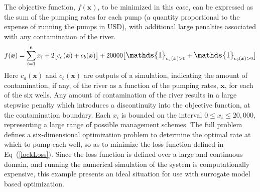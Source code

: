 \documentclass[12pt]{article}
\def \oner {
        \mathlarger{\mathds{1}}
}
\begin{document}
%
%

%
The objective function, $f(\bm{x})$, to be minimized in this case, can be expressed as the sum of the pumping rates for each pump (a quantity proportional to the expense of running the pumps in USD), with additional large penalties associated with any contamination of the river. %
\begin{equation}
f(\bm{x}) = \sum_{i=1}^6 x_i +  2\big[ c_a(\bm{x}) + c_b(\bm{x}) \big] + 20000 \big[ \oner_{c_a(\bm{x})>0} + \oner_{c_b(\bm{x})>0} \big] 
\label{lockLoss}
\end{equation}
Here $c_a(\bm{x})$ and $c_b(\bm{x})$ are outputs of a simulation, indicating the amount of contamination, if any, of the river as a function of the pumping rates, $\bm{x}$, for each of the six wells.
%
Any amount of contamination of the river results in a large stepwise penalty which introduces a discontinuity into the objective function, at the contamination boundary.
%
Each $x_i$ is bounded on the interval \mbox{$0\le x_i\le20,000$}, representing a large range of possible management schemes.
%
The full problem defines a six-dimensional optimization problem to determine the optimal rate at which to pump each well, so as to minimize the loss function defined in Eq~(\ref{lockLoss}).
%
Since the loss function is defined over a large and continuous domain, and running the numerical simulation of the system is computationally expensive, this example presents an ideal situation for use with surrogate model based optimization. 



% 
%
\end{document}
